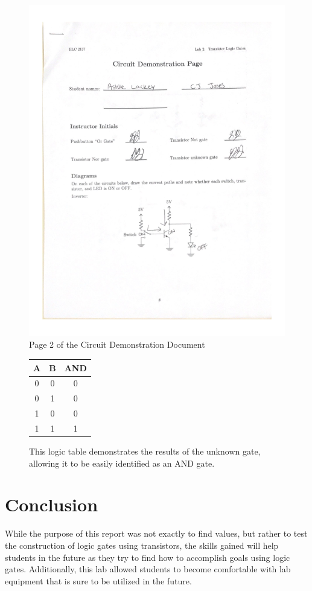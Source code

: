 \documentclass[11pt]{article}
\begin{document}
\begin{figure}
\includegraphics[page = 2, width=1.0\textwidth]{"Circuit Demonstration"}
\caption{Page 2 of the Circuit Demonstration Document}
\end{figure}

\begin{figure}[ht]\centering
	\begin{tabular}{cc|c}
		\toprule
		A & B & AND \\
		\midrule
		0 & 0 & 0 \\
		0 & 1 & 0 \\
		1 & 0 & 0 \\
		1 & 1 & 1 \\
		\bottomrule
	\end{tabular} 
	
	\caption{ This logic table demonstrates the results of the unknown gate, allowing it to be easily identified as an AND gate.}
\end{figure}
\clearpage
\section*{Conclusion}

While the purpose of this report was not exactly to find values, but rather to test the construction of logic gates using transistors, the skills gained will help students in the future as they try to find how to accomplish goals using logic gates. Additionally, this lab allowed students to become comfortable with lab equipment that is sure to be utilized in the future.
\end{document}
